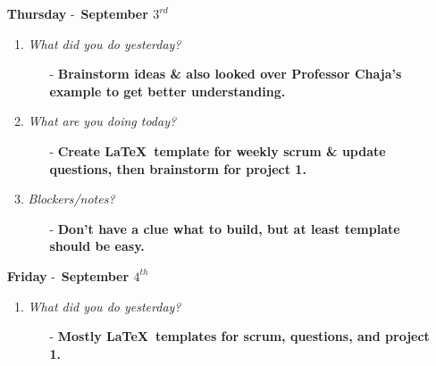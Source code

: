\begin{enumerate}
\begin{enumerate}
    \item \textsl{What did you do yesterday?}
    \begin{enumerate}
      \item[-] \textbf{Worked on Comp256 proofs (eww).}
    \end{enumerate}
    \item \textsl{What are you doing today?}
    \begin{enumerate}
      \item[-] \textbf{Brainstorm ideas for creating \LaTeX\ template which includes weekly scrum \& update questions.}
    \end{enumerate}
    \item \textsl{Blockers/notes?}
    \begin{enumerate}
      \item[-] \textbf{N/A}
    \end{enumerate}
  \end{enumerate} 
  \item[\textbf{Thursday}] -\ \textbf{September \(3^{rd}\)}
  \begin{enumerate}
    \item \textsl{What did you do yesterday?}
    \begin{enumerate}
      \item[-] \textbf{Brainstorm ideas \& also looked over Professor Chaja's example to get better understanding.}
    \end{enumerate}
    \item \textsl{What are you doing today?}
    \begin{enumerate}
      \item[-] \textbf{Create \LaTeX\ template for weekly scrum \& update questions, then brainstorm for project 1.}
    \end{enumerate}
    \item \textsl{Blockers/notes?}
    \begin{enumerate}
      \item[-] \textbf{Don't have a clue what to build, but at least template should be easy.}
    \end{enumerate}
  \end{enumerate} 
  \item[\textbf{Friday}] -\ \textbf{September \(4^{th}\)}
  \begin{enumerate}
    \item \textsl{What did you do yesterday?}
    \begin{enumerate}
      \item[-] \textbf{Mostly \LaTeX\ templates for scrum, questions, and project 1.}

\end{enumerate}
\end{enumerate}
\end{enumerate}
